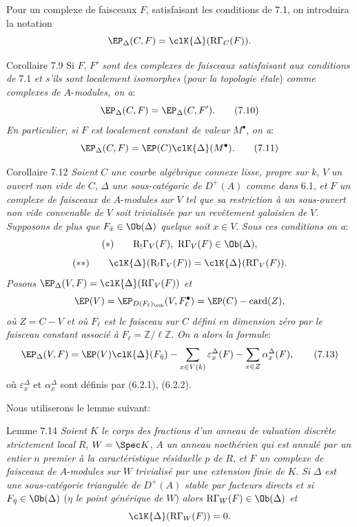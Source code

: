 Pour un complexe de faisceaux $F$, satisfaisant les conditions de 7.1, on introduira la notation
\[
\EP_\Delta(C,F)=\clK{\Delta}(\mathrm{R}\Gamma_C(F)).
\]

\begin{statement}{Corollaire 7.9}
Si $F$, $F'$ \emph{sont des complexes de faisceaux satisfaisant aux conditions de} 7.1 \emph{et s'ils sont localement isomorphes} (\emph{pour la topologie étale}) \emph{comme complexes de} $A$-\emph{modules, on a}:
\[
\EP_\Delta(C,F)=\EP_\Delta(C,F').
\tag{7.10}
\]
\emph{En particulier, si} $F$ \emph{est localement constant de valeur} $M^\bullet$, \emph{on a}:
\[
\EP_\Delta(C,F)=\EP(C)\clK{\Delta}(M^\bullet).
\tag{7.11}
\]
\end{statement}

\begin{statement}{Corollaire 7.12}
\emph{Soient} $C$ \emph{une courbe algébrique connexe lisse, propre sur} $k$, $V$ \emph{un ouvert non vide de} $C$, $\Delta$ \emph{une sous-catégorie de} $D^+(A)$ \emph{comme dans} 6.1, \emph{et} $F$ \emph{un complexe de faisceaux de} $A$-\emph{modules} \emph{sur} $V$ \emph{tel que sa restriction à un sous-ouvert non vide convenable de} $V$ \emph{soit trivialisée par un revêtement galoisien de} $V$. \emph{Supposons de plus que} $F_{\bar x}\in\Ob(\Delta)$ \emph{quelque soit} $x\in V$. \emph{Sous ces conditions on a}:
\[
(*)\qquad \mathrm{R}_!\Gamma_V(F),\ \mathrm{R}\Gamma_V(F)\in\Ob(\Delta),
\]
\[
(**)\qquad
\clK{\Delta}(\mathrm{R}_!\Gamma_V(F))=\clK{\Delta}(\mathrm{R}\Gamma_V(F)).
\]
\emph{Posons} $\EP_\Delta(V,F)=\clK{\Delta}(\mathrm{R}\Gamma_V(F))$ \emph{et}
\[
\EP(V)=\EP_{D(F_\ell)_{\coh}}(V,F_\ell^\bullet)=\EP(C)-\operatorname{card}(Z),
\]
\emph{où} $Z=C-V$ \emph{et où} $F_\ell$ \emph{est le faisceau sur} $C$ \emph{défini en dimension zéro par le faisceau constant associé à} $F_\ell=\mathbb{Z}/\ell\mathbb{Z}$. \emph{On a alors la formule}:
\[
\EP_\Delta(V,F)
=
\EP(V)\clK{\Delta}(F_{\bar\eta})
-\sum_{x\in V(k)}\varepsilon_x^\Delta(F)
-\sum_{x\in Z}\alpha_x^\Delta(F),
\tag{7.13}
\]
où $\varepsilon_x^\Delta$ et $\alpha_x^\Delta$ sont
définis par (6.2.1), (6.2.2).
\end{statement}

Nous utiliserons le lemme suivant:

\begin{statement}{Lemme 7.14}
\emph{Soient} $K$ \emph{le corps des fractions d'un anneau de valuation discrète strictement local} $R$, $W=\Spec K$, $A$ \emph{un anneau noethérien qui est annulé par un entier} $n$ \emph{premier à la caractéristique résiduelle} $p$ \emph{de} $R$, \emph{et} $F$ \emph{un complexe de faisceaux de} $A$-\emph{modules sur} $W$ \emph{trivialisé par une extension finie de} $K$. \emph{Si} $\Delta$ \emph{est une sous-catégorie triangulée de} $D^+(A)$ \emph{stable par facteurs directs et si} $F_{\bar\eta}\in\Ob(\Delta)$ ($\eta$ \emph{le point générique de} $W$) \emph{alors} $\mathrm{R}\Gamma_W(F)\in\Ob(\Delta)$ \emph{et}
\[
\clK{\Delta}(\mathrm{R}\Gamma_W(F))=0.
\]
\end{statement}

